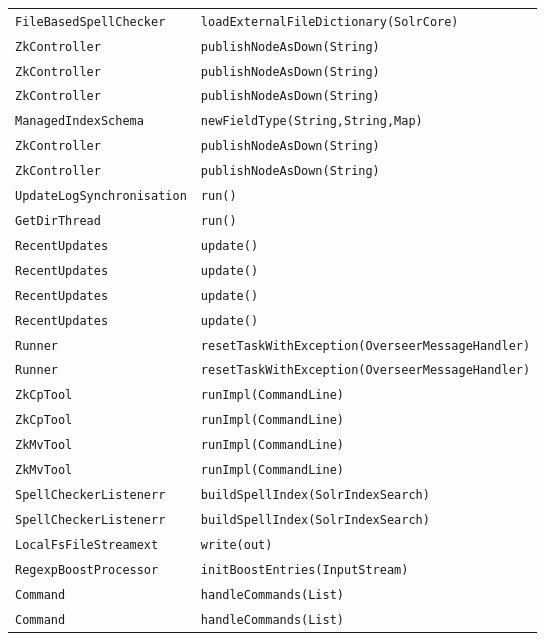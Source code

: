\begin{center}
\begin{longtable}{ll}
\lstinline/FileBasedSpellChecker/&{\lstinline/loadExternalFileDictionary(SolrCore)/}\\
\lstinline/ZkController/&{\lstinline/publishNodeAsDown(String)/}\\
\lstinline/ZkController/&{\lstinline/publishNodeAsDown(String)/}\\
\lstinline/ZkController/&{\lstinline/publishNodeAsDown(String)/}\\
\lstinline/ManagedIndexSchema/&{\lstinline/newFieldType(String,String,Map)/}\\
\lstinline/ZkController/&{\lstinline/publishNodeAsDown(String)/}\\
\lstinline/ZkController/&{\lstinline/publishNodeAsDown(String)/}\\
\lstinline/UpdateLogSynchronisation/&{\lstinline/run()/}\\
\lstinline/GetDirThread/&{\lstinline/run()/}\\
\lstinline/RecentUpdates/&{\lstinline/update()/}\\
\lstinline/RecentUpdates/&{\lstinline/update()/}\\
\lstinline/RecentUpdates/&{\lstinline/update()/}\\
\lstinline/RecentUpdates/&{\lstinline/update()/}\\
\lstinline/Runner/&{\lstinline/resetTaskWithException(OverseerMessageHandler)/}\\
\lstinline/Runner/&{\lstinline/resetTaskWithException(OverseerMessageHandler)/}\\
\lstinline/ZkCpTool/&{\lstinline/runImpl(CommandLine)/}\\
\lstinline/ZkCpTool/&{\lstinline/runImpl(CommandLine)/}\\
\lstinline/ZkMvTool/&{\lstinline/runImpl(CommandLine)/}\\
\lstinline/ZkMvTool/&{\lstinline/runImpl(CommandLine)/}\\
\lstinline/SpellCheckerListenerr/&{\lstinline/buildSpellIndex(SolrIndexSearch)/}\\
\lstinline/SpellCheckerListenerr/&{\lstinline/buildSpellIndex(SolrIndexSearch)/}\\
\lstinline/LocalFsFileStreamext/&{\lstinline/write(out)/}\\
\lstinline/RegexpBoostProcessor/&{\lstinline/initBoostEntries(InputStream)/}\\
\lstinline/Command/&{\lstinline/handleCommands(List)/}\\
\lstinline/Command/&{\lstinline/handleCommands(List)/}\\

\end{longtable}
\end{center}
